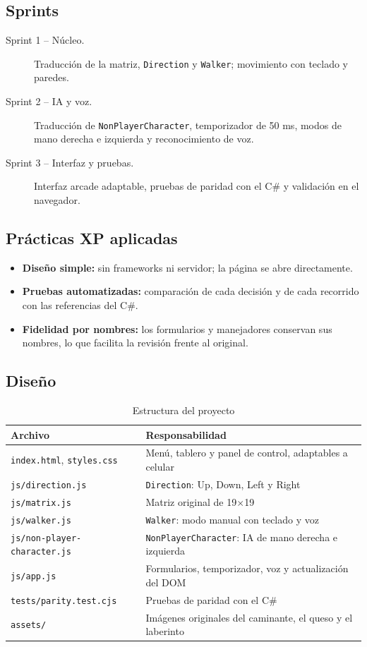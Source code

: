 \documentclass[12pt,a4paper]{article}
\begin{document}
\subsection{Sprints}
\begin{description}
  \item[Sprint 1 -- Núcleo.] Traducción de la matriz, \texttt{Direction} y \texttt{Walker}; movimiento con teclado y paredes.
  \item[Sprint 2 -- IA y voz.] Traducción de \texttt{NonPlayerCharacter}, temporizador de 50 ms, modos de mano derecha e izquierda y reconocimiento de voz.
  \item[Sprint 3 -- Interfaz y pruebas.] Interfaz arcade adaptable, pruebas de paridad con el C\# y validación en el navegador.
\end{description}

\subsection{Prácticas XP aplicadas}
\begin{itemize}
 \item \textbf{Diseño simple:} sin frameworks ni servidor; la página se abre directamente.
 \item \textbf{Pruebas automatizadas:} comparación de cada decisión y de cada recorrido con las referencias del C\#.
 \item \textbf{Fidelidad por nombres:} los formularios y manejadores conservan sus nombres, lo que facilita la revisión frente al original.
\end{itemize}

\subsection{Diseño}
\begin{table}[H]
\centering\small
\caption{Estructura del proyecto}
\begin{tabular}{p{5.4cm}p{8.2cm}}
\toprule
\textbf{Archivo} & \textbf{Responsabilidad}\\
\midrule
\texttt{index.html}, \texttt{styles.css} & Menú, tablero y panel de control, adaptables a celular\\
\texttt{js/direction.js} & \texttt{Direction}: Up, Down, Left y Right\\
\texttt{js/matrix.js} & Matriz original de 19$\times$19\\
\texttt{js/walker.js} & \texttt{Walker}: modo manual con teclado y voz\\
\texttt{js/non-player-character.js} & \texttt{NonPlayerCharacter}: IA de mano derecha e izquierda\\
\texttt{js/app.js} & Formularios, temporizador, voz y actualización del DOM\\
\texttt{tests/parity.test.cjs} & Pruebas de paridad con el C\#\\
\texttt{assets/} & Imágenes originales del caminante, el queso y el laberinto\\
\bottomrule
\end{tabular}
\end{table}
\end{document}
